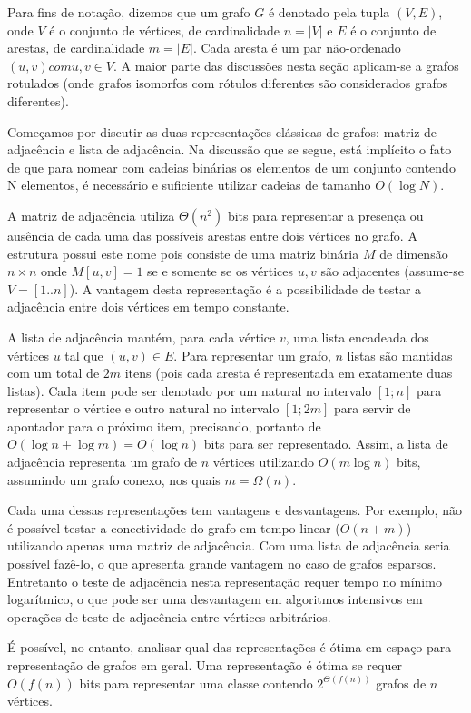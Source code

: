Para fins de notação, dizemos que um grafo $G$ é denotado pela tupla $(V, E)$, onde $V$ é o conjunto de vértices, de cardinalidade $n = |V|$ e $E$ é o conjunto de arestas, de cardinalidade $m = |E|$. Cada aresta é um par não-ordenado $(u, v) com u,v \in V$. A maior parte das discussões nesta seção aplicam-se a grafos rotulados (onde grafos isomorfos com rótulos diferentes são considerados grafos diferentes).

Começamos por discutir as duas representações clássicas de grafos: matriz de adjacência e lista de adjacência. Na discussão que se segue, está implícito o fato de que para nomear com cadeias binárias os elementos de um conjunto contendo N elementos, é necessário e suficiente utilizar cadeias de tamanho $O(\log N)$.

A matriz de adjacência utiliza $\Theta(n^2)$ bits para representar a presença ou ausência de cada uma das possíveis arestas entre dois vértices no grafo. A estrutura possui este nome pois consiste de uma matriz binária $M$ de dimensão $n \times n$ onde $M[u,v] = 1$ se e somente se os vértices $u,v$ são adjacentes (assume-se $V = [1..n]$). A vantagem desta representação é a possibilidade de testar a adjacência entre dois vértices em tempo constante.

A lista de adjacência mantém, para cada vértice $v$, uma lista encadeada dos vértices $u$ tal que $(u, v) \in E$. Para representar um grafo, $n$ listas são mantidas com um total de $2m$ itens (pois cada aresta é representada em exatamente duas listas). Cada item pode ser denotado por um natural no intervalo $[1;n]$ para representar o vértice e outro natural no intervalo $[1;2m]$ para servir de apontador para o próximo item, precisando, portanto de $O(\log n + \log m) = O(\log n)$ bits para ser representado. Assim, a lista de adjacência representa um grafo de $n$ vértices utilizando $O(m \log n)$ bits, assumindo um grafo conexo, nos quais $m = \Omega(n)$.

Cada uma dessas representações tem vantagens e desvantagens. Por exemplo, não é possível testar a conectividade do grafo em tempo linear ($O(n + m)$) utilizando apenas uma matriz de adjacência. Com uma lista de adjacência seria possível fazê-lo, o que apresenta grande vantagem no caso de grafos esparsos. Entretanto o teste de adjacência nesta representação requer tempo no mínimo logarítmico, o que pode ser uma desvantagem em algoritmos intensivos em operações de teste de adjacência entre vértices arbitrários.

É possível, no entanto, analisar qual das representações é ótima em espaço para representação de grafos em geral. Uma representação é ótima se requer $O(f(n))$ bits para representar uma classe contendo $2^{\Theta(f(n))}$ grafos de $n$ vértices.

